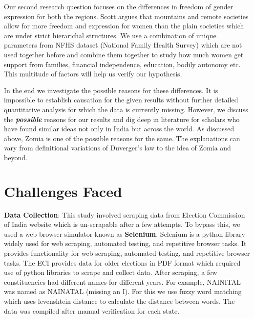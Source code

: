 \vspace{0.2cm}

Our second research question focuses on the differences in freedom of gender expression for both the regions. Scott argues that mountains and remote societies allow for more freedom and expression for women than the plain societies which are under strict hierarichal structures. We use a combination of unique parameters from NFHS dataset (National Family Health Survey) which are not used together before and combine them together to study how much women get support from families, financial independence, education, bodily autonomy etc. This multitude of factors will help us verify our hypothesis.

\vspace{0.2cm}

In the end we investigate the possible reasons for these differences. It is impossible to establish causation for the given results without further detailed quantitative analysis for which the data is currently missing. However, we discuss the \textit{\textbf{possible}} reasons for our results and dig deep in literature for scholars who have found similar ideas not only in India but across the world. As discussed above, Zomia is one of the possible reasons for the same. The explanations can vary from definitional variations of Duverger's law to the idea of Zomia and beyond. 

\section{Challenges Faced}

\textbf{Data Collection}: This study involved scraping data from Election Commission of India \citep{ECI_WEBSITE} website which is un-scrapable after a few attempts. To bypass this, we used a web browser simulator known as \textbf{Selenium}. Selenium is a python library widely used for web scraping, automated testing, and repetitive browser tasks. It provides functionality for web scraping, automated testing, and repetitive browser tasks. The ECI provides data for older elections in PDF format which required use of python libraries to scrape and collect data. After scraping, a few constituencies had different names for different years. For example, NAINITAL was named as NAINATAL (missing an I). For this we use fuzzy word matching which uses levenshtein distance to calculate the distance between words. The data was compiled after manual verification for each state.


